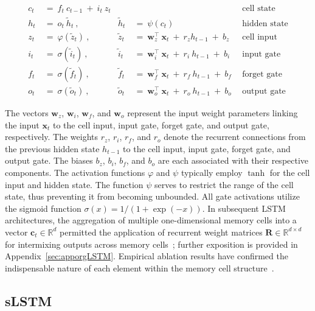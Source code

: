 \begin{align}
c_t \ &= \  f_t \ c_{t-1} \ + \ i_t \ z_t &  & &\text{cell state} \\
h_t  \ &= \ o_t \ \tilde{h}_t \ , & \tilde{h}_t \ &= \ \psi \left( c_t\right)
  &\text{hidden state} \\
z_t \ &= \ \varphi \left( \tilde{z}_t \right) \ , 
  &\tilde{z}_t \ &=  \ \mathbf{w}^\top_{z} \ \mathbf{x}_t \ + \
  r_{z}  h_{t-1} \ + \  b_{z} \ \
  &\text{cell input} \\
i_t \ &= \ \sigma \left( \tilde{i}_t  \right) \ , 
  &\tilde{i}_t \ &= \ \mathbf{w}^\top_{i} \ \mathbf{x}_t \ + \
  r_{i}  \ h_{t-1} \ + \  b_{i} \ \
  &\text{input gate} \\
f_t \ &= \ \sigma \left(  \tilde{f}_t \right) \ , 
  &\tilde{f}_t \ &= \ \mathbf{w}^\top_{f} \ \mathbf{x}_t  \ + \
  r_{f}  \ h_{t-1} \ + \  b_{f} \ \
  &\text{forget gate} \\
o_t \ &= \ \sigma \left( \tilde{o}_t \right) \ , 
  &\tilde{o}_t  \ &= \ \mathbf{w}^\top_{o} \ \mathbf{x}_t \ + \
  r_{o}  \ h_{t-1} \ + \  b_{o} \ \
  &\text{output gate} 
\end{align}

The vectors $\mathbf{w}_{z}$, $\mathbf{w}_{i}$, $\mathbf{w}_{f}$, and $\mathbf{w}_{o}$ represent the input weight parameters linking the input $\mathbf{x}_t$ to the cell input, input gate, forget gate, and output gate, respectively. The weights $r_{z}$, $r_{i}$, $r_{f}$, and $r_{o}$ denote the recurrent connections from the previous hidden state $h_{t-1}$ to the cell input, input gate, forget gate, and output gate. The biases $b_{z}$, $b_{i}$, $b_{f}$, and $b_{o}$ are each associated with their respective components. The activation functions $\varphi$ and $\psi$ typically employ $\tanh$ for the cell input and hidden state. The function $\psi$ serves to restrict the range of the cell state, thus preventing it from becoming unbounded. All gate activations utilize the sigmoid function $\sigma \left( x \right)= 1/(1+\exp(-x))$. In subsequent LSTM architectures, the aggregation of multiple one-dimensional memory cells into a vector $\mathbf{c}_t \in \mathbb{R}^{d}$ permitted the application of recurrent weight matrices $\mathbf{R} \in \mathbb{R}^{d \times d}$ for intermixing outputs across memory cells~\citep{Greff:15}; further exposition is provided in Appendix~\ref{sec:apporgLSTM}. Empirical ablation results have confirmed the indispensable nature of each element within the memory cell structure~\citep{Greff:15}.

\subsection{sLSTM}
\label{sec:sLSTM}

